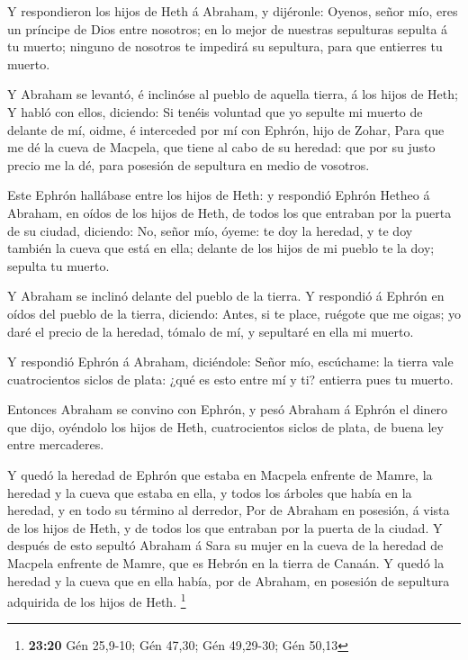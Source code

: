  Y respondieron los hijos de Heth á Abraham, y dijéronle:
 Oyenos, señor mío, eres un príncipe de Dios entre
nosotros; en lo mejor de nuestras sepulturas sepulta á tu muerto;
ninguno de nosotros te impedirá su sepultura, para que entierres tu
muerto.

 Y Abraham se levantó, é inclinóse al pueblo de aquella
tierra, á los hijos de Heth;  Y habló con ellos, diciendo:
Si tenéis voluntad que yo sepulte mi muerto de delante de mí, oidme, é
interceded por mí con Ephrón, hijo de Zohar,  Para que me
dé la cueva de Macpela, que tiene al cabo de su heredad: que por su
justo precio me la dé, para posesión de sepultura en medio de vosotros.

 Este Ephrón hallábase entre los hijos de Heth: y
respondió Ephrón Hetheo á Abraham, en oídos de los hijos de Heth, de
todos los que entraban por la puerta de su ciudad, diciendo:
 No, señor mío, óyeme: te doy la heredad, y te doy
también la cueva que está en ella; delante de los hijos de mi pueblo te
la doy; sepulta tu muerto.

 Y Abraham se inclinó delante del pueblo de la tierra.
 Y respondió á Ephrón en oídos del pueblo de la tierra,
diciendo: Antes, si te place, ruégote que me oigas; yo daré el precio de
la heredad, tómalo de mí, y sepultaré en ella mi muerto.

 Y respondió Ephrón á Abraham, diciéndole:
 Señor mío, escúchame: la tierra vale cuatrocientos
siclos de plata: ¿qué es esto entre mí y ti? entierra pues tu muerto.

 Entonces Abraham se convino con Ephrón, y pesó Abraham á
Ephrón el dinero que dijo, oyéndolo los hijos de Heth, cuatrocientos
siclos de plata, de buena ley entre mercaderes.

 Y quedó la heredad de Ephrón que estaba en Macpela
enfrente de Mamre, la heredad y la cueva que estaba en ella, y todos los
árboles que había en la heredad, y en todo su término al derredor,
 Por de Abraham en posesión, á vista de los hijos de
Heth, y de todos los que entraban por la puerta de la ciudad.
 Y después de esto sepultó Abraham á Sara su mujer en la
cueva de la heredad de Macpela enfrente de Mamre, que es Hebrón en la
tierra de Canaán.  Y quedó la heredad y la cueva que en
ella había, por de Abraham, en posesión de sepultura adquirida de los
hijos de Heth. \footnote{\textbf{23:20} Gén 25,9-10; Gén 47,30; Gén
  49,29-30; Gén 50,13}

